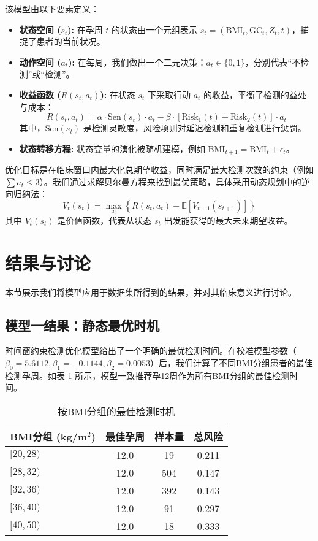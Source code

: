 \documentclass[UTF8, a4paper, 11pt]{ctexart}
\begin{document}
该模型由以下要素定义：
\begin{itemize}
    \item \textbf{状态空间 ($s_t$):} 在孕周 $t$ 的状态由一个元组表示 $s_t = (\text{BMI}_t, \text{GC}_t, Z_t, t)$，捕捉了患者的当前状况。
    \item \textbf{动作空间 ($a_t$):} 在每周，我们做出一个二元决策：$a_t \in \{0, 1\}$，分别代表“不检测”或“检测”。
    \item \textbf{收益函数 ($R(s_t, a_t)$):} 在状态 $s_t$ 下采取行动 $a_t$ 的收益，平衡了检测的益处与成本：
    \begin{equation}
    R(s_t,a_t) = \alpha \cdot \text{Sen}(s_t) \cdot a_t - \beta \cdot \left[ \text{Risk}_1(t) + \text{Risk}_2(t) \right] \cdot a_t
    \end{equation}
    其中，$\text{Sen}(s_t)$ 是检测灵敏度，风险项则对延迟检测和重复检测进行惩罚。
    \item \textbf{状态转移方程:} 状态变量的演化被随机建模，例如 $\text{BMI}_{t+1} = \text{BMI}_t + \epsilon_t$。
\end{itemize}
优化目标是在临床窗口内最大化总期望收益，同时满足最大检测次数的约束（例如 $\sum a_t \le 3$）。我们通过求解贝尔曼方程来找到最优策略，具体采用动态规划中的逆向归纳法：
\begin{equation}
V_t(s_t) = \max_{a_t} \left\{ R(s_t,a_t) + \mathbb{E}[V_{t+1}(s_{t+1})] \right\}
\end{equation}
其中 $V_t(s_t)$ 是价值函数，代表从状态 $s_t$ 出发能获得的最大未来期望收益。

\section{结果与讨论}
本节展示我们将模型应用于数据集所得到的结果，并对其临床意义进行讨论。

\subsection{模型一结果：静态最优时机}
时间窗约束检测优化模型给出了一个明确的最优检测时间。在校准模型参数（$\beta_0=5.6112, \beta_1=-0.1144, \beta_2=0.0053$）后，我们计算了不同BMI分组患者的最佳检测孕周。如表 \ref{tab:bmi_timing_zh} 所示，模型一致推荐孕12周作为所有BMI分组的最佳检测时间。

\begin{table}[H]
\centering
\caption{按BMI分组的最佳检测时机}
\label{tab:bmi_timing_zh}
\begin{tabular}{@{}lccc@{}}
\toprule
BMI分组 (kg/m$^2$) & 最佳孕周 & 样本量 & 总风险 \\ \midrule
$[20, 28)$ & 12.0 & 19 & 0.211 \\
$[28, 32)$ & 12.0 & 504 & 0.147 \\
$[32, 36)$ & 12.0 & 392 & 0.143 \\
$[36, 40)$ & 12.0 & 91 & 0.297 \\
$[40, 50)$ & 12.0 & 18 & 0.333 \\ \bottomrule
\end{tabular}
\end{table}
\end{document}
